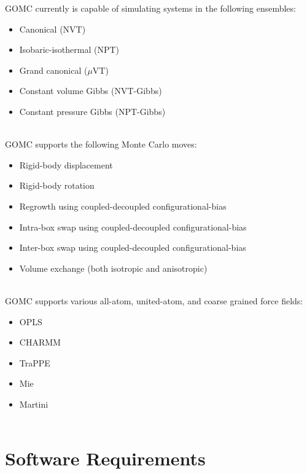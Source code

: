 GOMC currently is capable of simulating systems in the following ensembles: 
\begin{itemize}
	\item Canonical (NVT)
	\item Isobaric-isothermal (NPT)
	\item Grand canonical ($\mu$VT) 
	\item Constant volume Gibbs (NVT-Gibbs) 
	\item Constant pressure Gibbs (NPT-Gibbs) \\\\
\end{itemize}

GOMC supports the following Monte Carlo moves: 
\begin{itemize}
	\item Rigid-body displacement 
	\item Rigid-body rotation
	\item Regrowth using coupled-decoupled configurational-bias  
	\item Intra-box swap using coupled-decoupled configurational-bias
	\item Inter-box swap using coupled-decoupled configurational-bias
	\item Volume exchange (both isotropic and anisotropic) \\\\
\end{itemize}

GOMC supports various all-atom, united-atom, and coarse grained force fields: 
\begin{itemize}
	\item OPLS
	\item CHARMM
	\item TraPPE
	\item Mie
	\item Martini\\\\
\end{itemize}

\section{Software Requirements}

